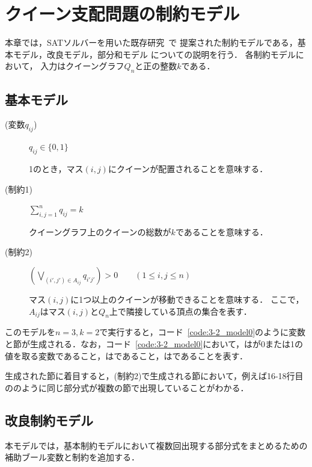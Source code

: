 \chapter{クイーン支配問題の制約モデル}\label{chap:constraint}
本章では，SATソルバーを用いた既存研究~\cite{yamamoto21}で
提案された制約モデルである，基本モデル，改良モデル，部分和モデル
についての説明を行う．
各制約モデルにおいて，
入力はクイーングラフ$Q_{n}$と正の整数$k$である．

\section{基本モデル}
\begin{description}
 \item[(変数$q_{ij}$)] $q_{ij} \in \{0,1\}$ \par
1のとき，マス$(i,j)$にクイーンが配置されることを意味する．
 \item[(制約1)] $\sum\limits_{i,j=1}^{n} q_{ij} = k$ \par
クイーングラフ上のクイーンの総数が$k$であることを意味する．
 \item[(制約2)] $(\bigvee\limits_{(i',j')\in A_{ij}} q_{i'j'}) >0 \qquad (1 \leq i,j \leq n)$ \par
マス$(i,j)$に1つ以上のクイーンが移動できることを意味する．
ここで，$A_{ij}$はマス$(i,j)$と$Q_n$上で隣接している頂点の集合を表す．
\end{description}

このモデルを$n=3,k=2$で実行すると，コード~\ref{code:3-2_model0}のように変数と節が生成される．なお，コード~\ref{code:3-2_model0}において，はが0または1の値を取る変数であること，はであること，はであることを表す．

生成された節に着目すると，(制約2)で生成される節において，例えば16-18行目ののように同じ部分式が複数の節で出現していることがわかる．


\section{改良制約モデル}
本モデルでは，基本制約モデルにおいて複数回出現する部分式をまとめるための補助ブール変数と制約を追加する．


